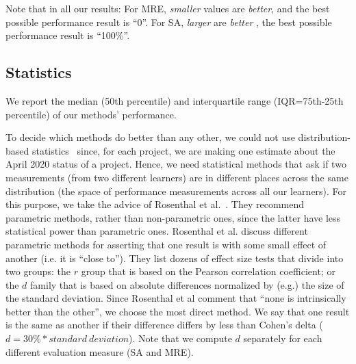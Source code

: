 \documentclass[sigconf,review,anonymous]{acmart}
\newcommand{\bi}{\begin{itemize}}
\newcommand{\ei}{\end{itemize}}
\begin{document}
Note that in all our results: For MRE, {\em smaller}  values are {\em better}, and the best possible performance result is ``0''. For SA,  {\em larger} are {\em better }, the best possible performance result is ``100\%''.


\subsection{Statistics}
\label{sect:stats} 
We report the median (50th percentile) and interquartile range (IQR=75th-25th percentile) of our methods' performance.  


To decide which methods do better than any other,   we could not use distribution-based statistics~\cite{kampenes2007systematic,arcuri2011practical,mittas2012ranking} since, for each project, we are making one estimate about the April 2020 status of a  project.  Hence, we need statistical
methods that ask if two measurements (from two different learners) are in different places
across the same distribution (the space of performance measurements across all our  learners).
For this purpose, we take the advice of  Rosenthal et al.~\cite{rosenthal1994parametric}. They recommend parametric methods, rather than non-parametric ones, since  the latter   have  less statistical power than parametric ones. 
 Rosenthal et al. discuss different parametric methods for asserting that one result is with some small effect of another (i.e. it is ``close to'').
 They list dozens of effect size tests that divide into two groups:    the $r$ group that is based on the Pearson correlation coefficient; or the $d$ family that is based on absolute differences normalized by (e.g.) the size of the standard deviation.   
 Since Rosenthal et al comment that ``none is intrinsically better than the other'', we choose the most direct method. 
 We say that one result is the same as another if their difference  
 differs by less than  Cohen's delta ($\mathit{d=30\%*standard\ deviation}$). 
 Note that we compute $d$ separately for each different evaluation measure  (SA and MRE).
 

\
\end{document}
